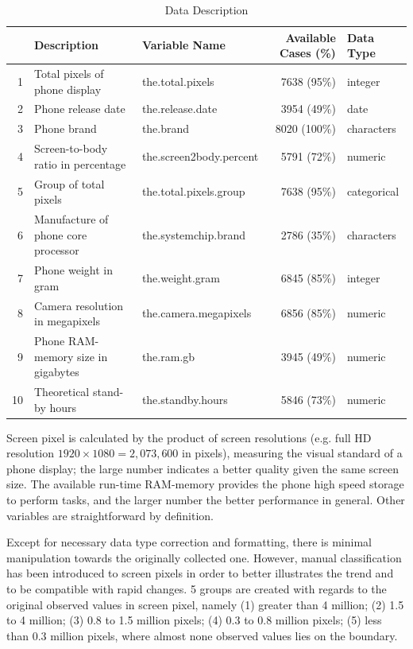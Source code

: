 \documentclass[utf8,english]{gradu3}
\begin{document}
\begin{table}[ht]
\label{tbl: vars}
\caption{Data Description}
\centering
\begin{tabular}{rllrl}
  \hline
 & Description & Variable Name & Available Cases (\%) & Data Type \\ 
  \hline
  1 & \multicolumn{1}{p{3.5cm}}{\raggedright Total pixels of phone display} & the.total.pixels & 7638 (95\%) & integer\\ 
  2 & \multicolumn{1}{p{3.5cm}}{\raggedright Phone release date} & the.release.date & 3954 (49\%) & date \\ 
  3 & \multicolumn{1}{p{3.5cm}}{\raggedright Phone brand} & the.brand & 8020 (100\%) & characters \\ 
  4 & \multicolumn{1}{p{3.5cm}}{\raggedright Screen-to-body ratio in percentage} & the.screen2body.percent & 5791 (72\%) & numeric\\ 
  5 & \multicolumn{1}{p{3.5cm}}{\raggedright Group of total pixels} & the.total.pixels.group & 7638 (95\%) & categorical \\ 
  6 & \multicolumn{1}{p{3.5cm}}{\raggedright Manufacture of phone core processor} & the.systemchip.brand & 2786 (35\%) & characters \\ 
  7 & \multicolumn{1}{p{3.5cm}}{\raggedright Phone weight in gram} & the.weight.gram & 6845 (85\%) & integer \\ 
  8 & \multicolumn{1}{p{3.5cm}}{\raggedright Camera resolution in megapixels} & the.camera.megapixels & 6856 (85\%) & numeric\\ 
  9 & \multicolumn{1}{p{3.5cm}}{\raggedright Phone RAM-memory size in gigabytes} & the.ram.gb & 3945 (49\%) & numeric\\ 
  10 & \multicolumn{1}{p{3.5cm}}{\raggedright Theoretical stand-by hours} & the.standby.hours & 5846 (73\%) & numeric \\ 
   \hline
\end{tabular}
\end{table}

Screen pixel is calculated by the product of screen resolutions (e.g. full HD resolution $1920\times 1080 = 2,073,600$ in pixels), measuring the visual standard of a phone display; the large number indicates a better quality given the same screen size. The available run-time RAM-memory provides the phone high speed storage to perform tasks, and the larger number the better performance in general. Other variables are straightforward by definition.

Except for necessary data type correction and formatting, there is minimal manipulation towards the originally collected one. However, manual classification has been introduced to screen pixels in order to better illustrates the trend and to be compatible with rapid changes. 5 groups are created with regards to the original observed values in screen pixel, namely (1) greater than 4 million; (2) 1.5 to 4 million; (3) 0.8 to 1.5 million pixels; (4) 0.3 to 0.8 million pixels; (5) less than 0.3 million pixels, where almost none observed values lies on the boundary.
\end{document}
